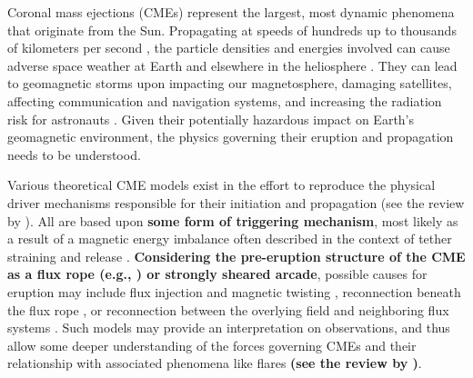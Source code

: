 \documentclass[namedreferences]{solarphysics}
\begin{document}
\begin{article}
Coronal mass ejections (CMEs) represent the largest, most dynamic phenomena that originate from the Sun. Propagating at speeds of hundreds up to thousands of kilometers per second \cite{2004JGRA..10907105Y}, the particle densities and energies involved can cause adverse space weather at Earth and elsewhere in the heliosphere \cite{2005AnGeo..23.1033S}. They can lead to geomagnetic storms upon impacting our magnetosphere, damaging satellites, affecting communication and navigation systems, and increasing the radiation risk for astronauts \cite{2007A&G....48f..11L}. Given their potentially hazardous impact on Earth's geomagnetic environment, the physics governing their eruption and propagation needs to be understood. 

Various theoretical CME models exist in the effort to reproduce the physical driver mechanisms responsible for their initiation and propagation (see the review by ). All are based upon {\bf some form of triggering mechanism}, most likely as a result of a magnetic energy imbalance often described in the context of tether straining and release \cite{2001AGUGM.125..143K}. {\bf Considering the pre-eruption structure of the CME as a flux rope (e.g., ) or strongly sheared arcade}, possible causes for eruption may include flux injection and magnetic twisting \cite{2006PhRvL..96y5002K,2001ApJ...562.1045K}, reconnection beneath the flux rope \cite{2007ApJ...658L.123L,2003ApJ...595.1231A,1995ApJ...446..377F,1980IAUS...91..207M}, or reconnection between the overlying field and neighboring flux systems \cite{2008ApJ...683.1192L,2007ApJ...671L..77V,1999ApJ...510..485A}. Such models may provide an interpretation on observations, and thus allow some deeper understanding of the forces governing CMEs and their relationship with associated phenomena like flares {\bf (see the review by )}.


\end{article}
\end{document}
